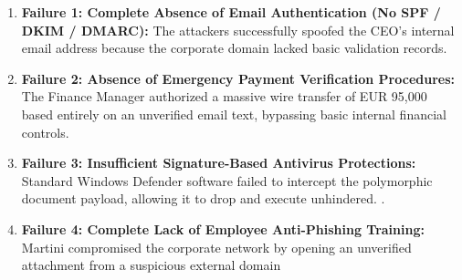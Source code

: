 \begin{enumerate}
    \item \textbf{Failure 1: Complete Absence of Email Authentication (No SPF / DKIM / DMARC):} The attackers successfully spoofed the CEO's internal email address because the corporate domain lacked basic validation records.
   
    \item \textbf{Failure 2: Absence of Emergency Payment Verification Procedures:} The Finance Manager authorized a massive wire transfer of EUR 95,000 based entirely on an unverified email text, bypassing basic internal financial controls.
    
    \item \textbf{Failure 3: Insufficient Signature-Based Antivirus Protections:} Standard Windows Defender software failed to intercept the polymorphic document payload, allowing it to drop and execute unhindered.
   .
    \item \textbf{Failure 4: Complete Lack of Employee Anti-Phishing Training:} Martini compromised the corporate network by opening an unverified attachment from a suspicious external domain 
\end{enumerate}


